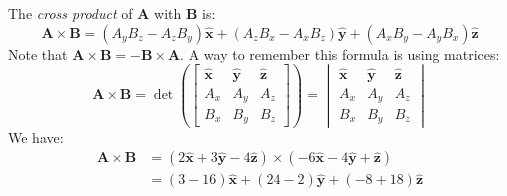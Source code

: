             \begin{solution}
                The \textit{cross product} of $\mathbf{A}$
                with $\mathbf{B}$ is:
                \begin{equation}
                    \mathbf{A}\times\mathbf{B}=
                         (A_{y}B_{z}-A_{z}B_{y})\hat{\mathbf{x}}
                        +(A_{z}B_{x}-A_{x}B_{z})\hat{\mathbf{y}}
                        +(A_{x}B_{y}-A_{y}B_{x})\hat{\mathbf{z}}
                \end{equation}
                Note that
                $\mathbf{A}\times\mathbf{B}%
                 =\minus\mathbf{B}\times\mathbf{A}$.
                A way to remember this formula is using matrices:
                \begin{equation}
                    \mathbf{A}\times\mathbf{B}
                    =\det\left(
                        \begin{bmatrix}
                            \hat{\mathbf{x}}&
                            \hat{\mathbf{y}}&
                            \hat{\mathbf{z}}\\
                            A_{x}&A_{y}&A_{z}\\
                            B_{x}&B_{y}&B_{z}
                        \end{bmatrix}
                    \right)
                    =
                    \begin{vmatrix}
                        \hat{\mathbf{x}}&
                        \hat{\mathbf{y}}&
                        \hat{\mathbf{z}}\\
                        A_{x}&A_{y}&A_{z}\\
                        B_{x}&B_{y}&B_{z}
                    \end{vmatrix}
                \end{equation}
                We have:
                \begin{subequations}
                    \begin{align}
                        \mathbf{A}\times\mathbf{B}
                        &=(2\hat{\mathbf{x}}+3\hat{\mathbf{y}}
                            -4\hat{\mathbf{z}})\times
                            (\minus{6}\hat{\mathbf{x}}
                            -4\hat{\mathbf{y}}
                            +\hat{\mathbf{z}})\\
                        &=(3-16)\hat{\mathbf{x}}
                            +(24-2)\hat{\mathbf{y}}
                            +(\minus{8}+18)\hat{\mathbf{z}}\\

\end{align}
\end{subequations}
\end{solution}
